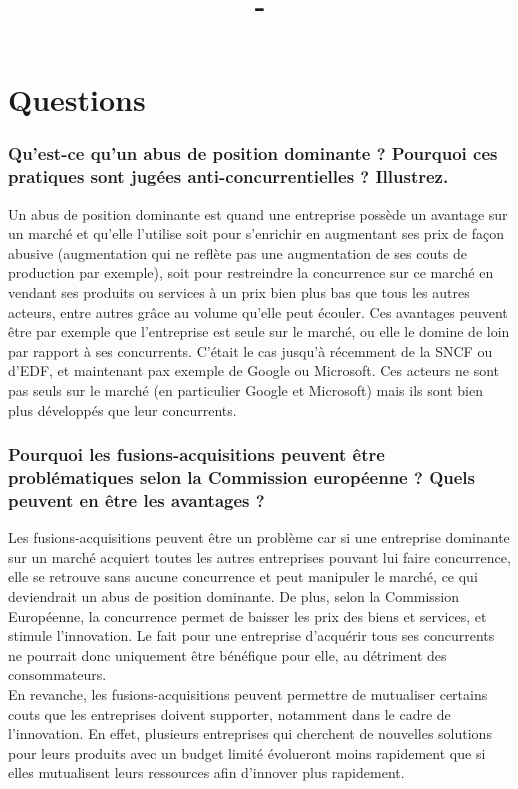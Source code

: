 \documentclass[11pt,a4paper,multicol]{article}
\author{\setAuthors}
\title{\textbf{\UV - \courseNumber} \\ \setTitle}
\date{\textit{\setDate}}
\begin{document}
\maketitle{}


\part*{Questions}

\section{Qu'est-ce qu'un abus de position dominante ? Pourquoi ces pratiques sont jugées anti-concurrentielles ? Illustrez.}
Un abus de position dominante est quand une entreprise possède un avantage sur un marché et qu'elle l'utilise soit pour s'enrichir en augmentant ses prix de façon abusive (augmentation qui ne reflète pas une augmentation de ses couts de production par exemple), soit pour restreindre la concurrence sur ce marché en vendant ses produits ou services à un prix bien plus bas que tous les autres acteurs, entre autres grâce au volume qu'elle peut écouler. Ces avantages peuvent être par exemple que l'entreprise est seule sur le marché, ou elle le domine de loin par rapport à ses concurrents. C'était le cas jusqu'à récemment de la SNCF ou d'EDF, et maintenant pax exemple de Google ou Microsoft. Ces acteurs ne sont pas seuls sur le marché (en particulier Google et Microsoft) mais ils sont bien plus développés que leur concurrents.

\section{Pourquoi les fusions-acquisitions peuvent être problématiques selon la Commission européenne ? Quels peuvent en être les avantages ?}
Les fusions-acquisitions peuvent être un problème car si une entreprise dominante sur un marché acquiert toutes les autres entreprises pouvant lui faire concurrence, elle se retrouve sans aucune concurrence et peut manipuler le marché, ce qui deviendrait un abus de position dominante. De plus, selon la Commission Européenne, la concurrence permet de baisser les prix des biens et services, et stimule l'innovation. Le fait pour une entreprise d'acquérir tous ses concurrents ne pourrait donc uniquement être bénéfique pour elle, au détriment des consommateurs.\\
En revanche, les fusions-acquisitions peuvent permettre de mutualiser certains couts que les entreprises doivent supporter, notamment dans le cadre de l'innovation. En effet, plusieurs entreprises qui cherchent de nouvelles solutions pour leurs produits avec un budget limité évolueront moins rapidement que si elles mutualisent leurs ressources afin d'innover plus rapidement.
\end{document}
